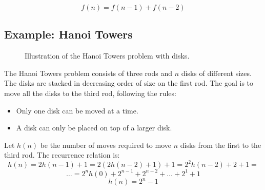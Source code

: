 \documentclass[11pt]{article}
\begin{document}
\[
f(n) = f(n-1) + f(n-2)
\]

\hskip-1.5cm
\subsection*{Example: Hanoi Towers}

\begin{figure}[!h]
    \centering
    \caption{Illustration of the Hanoi Towers problem with disks.}
    \label{fig:hanoi}
\end{figure}

The Hanoi Towers problem consists of three rods and $n$ disks of different sizes. The disks are stacked in decreasing order of size on the first rod. The goal is to move all the disks to the third rod, following the rules:
\begin{itemize}
    \item Only one disk can be moved at a time.
    \item A disk can only be placed on top of a larger disk.
\end{itemize}

Let $h(n)$ be the number of moves required to move $n$ disks from the first to the third rod. The recurrence relation is:
\[
h(n) = 2h(n-1) + 1 = 2(2h(n-2) + 1) + 1 = 2^2 h(n-2) + 2 + 1 =
\]
\[
\dots = 2^n h(0) + 2^{n-1} + 2^{n-2} + \dots + 2^1 + 1
\]
\[
h(n) = 2^n - 1
\]
\end{document}
